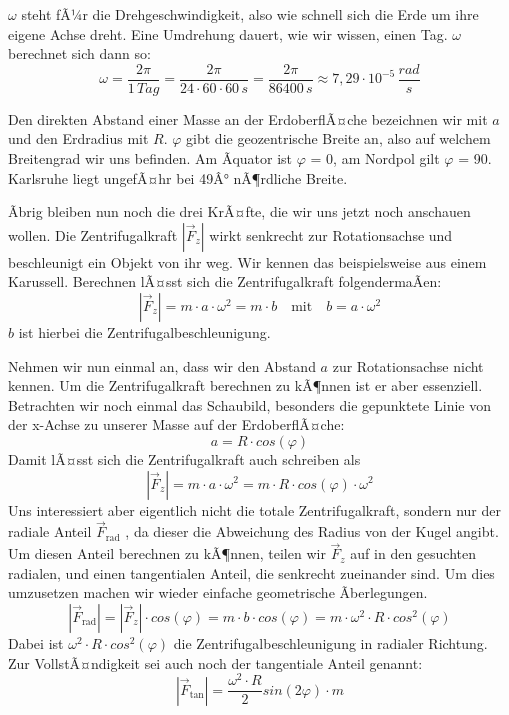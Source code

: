 $\omega$ steht fÃ¼r die Drehgeschwindigkeit, also wie schnell sich die Erde um ihre eigene Achse dreht. Eine Umdrehung dauert, wie wir wissen, einen Tag. $\omega$ berechnet sich dann so: \begin{equation*}
	\omega = \frac{2 \pi}{1 \,\si{Tag}} = \frac{2 \pi}{24 \cdot 60 \cdot 60\,\si{s}} = \frac{2 \pi}{86400\,\si{s}} \approx 7,29 \cdot 10^{-5}\,\si{\frac{rad}{s}}
\end{equation*}

Den direkten Abstand einer Masse an der ErdoberflÃ¤che bezeichnen wir mit $a$ und den Erdradius mit $R$. 
$\varphi$ gibt die geozentrische Breite an, also auf welchem Breitengrad wir uns befinden. Am Ãquator ist $\varphi$ = 0, am Nordpol gilt $\varphi$ = 90. Karlsruhe liegt ungefÃ¤hr bei 49Â° nÃ¶rdliche Breite.

Ãbrig bleiben nun noch die drei KrÃ¤fte, die wir uns jetzt noch anschauen wollen. 
Die Zentrifugalkraft $|\vec{F}_z|$  wirkt senkrecht zur Rotationsachse und beschleunigt ein Objekt von ihr weg. Wir kennen das beispielsweise aus einem Karussell. Berechnen lÃ¤sst sich die Zentrifugalkraft folgendermaÃen: \begin{equation*}
	|\vec{F}_z| = m \cdot a \cdot \omega^2 = m \cdot b \quad \text{mit} \quad b = a \cdot \omega^2  
\end{equation*} $b$ ist hierbei die Zentrifugalbeschleunigung. 

Nehmen wir nun einmal an, dass wir den Abstand $a$  zur Rotationsachse nicht kennen. Um die Zentrifugalkraft berechnen zu kÃ¶nnen ist er aber essenziell. Betrachten wir noch einmal das Schaubild, besonders die gepunktete Linie von der x-Achse zu unserer Masse auf der ErdoberflÃ¤che: \begin{equation*}
	a = R \cdot cos(\varphi) 
	\end{equation*} 
Damit lÃ¤sst sich die Zentrifugalkraft auch schreiben als \begin{equation*}
	|\vec{F}_z| = m \cdot a \cdot \omega^2 = m \cdot R \cdot cos(\varphi) \cdot \omega^2
\end{equation*}
Uns interessiert aber eigentlich nicht die totale Zentrifugalkraft, sondern nur der radiale Anteil $\vec{F}_{\text{rad}}$ , da dieser die Abweichung des Radius von der Kugel angibt. Um diesen Anteil berechnen zu kÃ¶nnen, teilen wir $\vec{F}_z$ auf in den gesuchten radialen, und einen tangentialen Anteil, die senkrecht zueinander sind. Um dies umzusetzen machen wir wieder einfache geometrische Ãberlegungen. \begin{equation*}
	|\vec{F}_{\text{rad}}| = |\vec{F}_z| \cdot cos(\varphi) = m \cdot b \cdot cos(\varphi) = m \cdot \omega^2 \cdot R \cdot cos^2(\varphi) 
\end{equation*} Dabei ist $\omega^2 \cdot R \cdot cos^2(\varphi)$ die Zentrifugalbeschleunigung in radialer Richtung. 
Zur VollstÃ¤ndigkeit sei auch noch der tangentiale Anteil genannt:  \begin{equation*}
	|\vec{F}_{\text{tan}}| = \frac{\omega^2 \cdot R}{2} sin(2\varphi) \cdot m 
\end{equation*}

